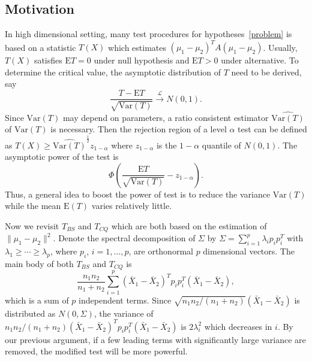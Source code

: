 \documentclass[review]{elsarticle}
\theoremstyle{plain}
\theoremstyle{definition}
\theoremstyle{remark}
\begin{document}
\subsection{Motivation}
 In high dimensional setting, many test procedures for hypotheses~\eqref{problem} is based on a statistic $T(X)$ which estimates ${(\mu_1-\mu_2)}^T A(\mu_1-\mu_2)$.
 Usually, $T(X)$ satisfies $\mathrm{E}T=0$ under null hypothesis and $\mathrm{E}T> 0$  under alternative.
 To determine the critical value, the asymptotic distribution of $T$ need to be derived, say 
 $$\frac{T-\textrm{E}T}{\sqrt{\textrm{Var}(T)}}\xrightarrow{\mathcal{L}} N(0,1).$$
 Since $\textrm{Var}(T)$ may depend on parameters, a ratio consistent estimator $\widehat{\textrm{Var}(T)}$ of $\textrm{Var}(T)$ is necessary. Then
 the rejection region of a level $\alpha$ test can be defined as $T(X)\geq \widehat{\textrm{Var}(T)}^{\frac{1}{2}}z_{1-\alpha}$ where $z_{1-\alpha}$ is the $1-\alpha$ quantile of $N(0,1)$. 
The asymptotic power of the test is 
$$\Phi(\frac{\mathrm{E}T}{\sqrt{\mathrm{Var}(T)}}-z_{1-\alpha}).$$
Thus, a general idea to boost the power of test is to reduce the variance $\mathrm{Var}(T)$ while the mean $\mathrm{E}(T)$ varies relatively little.

Now we revisit $T_{BS}$ and $T_{CQ}$ which are both based on the estimation of $\|\mu_1-\mu_2\|^2$. Denote the spectral decomposition of $\Sigma$ by $\Sigma =\sum_{i=1}^p \lambda_i p_i p_i^T$  with $\lambda_1\geq \cdots \geq \lambda_p$, where $p_i$, $i=1,\ldots,p$, are orthonormal $p$ dimensional vectors. The main body of both $T_{BS}$ and $T_{CQ}$ is 
\begin{equation}\label{qifa}
    \frac{n_1 n_2}{n_1+n_2}\sum_{i=1}^p {(\bar{X}_1-\bar{X}_2)}^T  p_i p_i^T (\bar{X}_1-\bar{X}_2),
\end{equation}
which is a sum of $p$ independent terms. Since $\sqrt{{n_1 n_2}/{(n_1+n_2)}}(\bar{X}_1-\bar{X}_2)$ is distributed as $N(0,\Sigma)$, the variance of ${n_1 n_2}/{(n_1+n_2)} {(\bar{X}_1-\bar{X}_2)}^T  p_i p_i^T (\bar{X}_1-\bar{X}_2)$ is $2\lambda_i^2$ which decreases in $i$. By our previous argument, if a few leading terms with significantly large variance are removed, the modified test will be more powerful.
\end{document}

